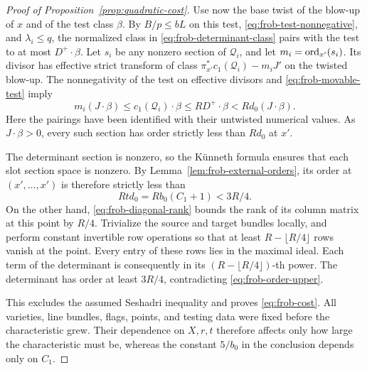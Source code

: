 \begin{proof}[Proof of Proposition~\ref{prop:quadratic-cost}]
Use now the base twist of the blow-up of $x$ and of the test class
$\beta$.  By $B/p\le bL$ on this test,
\eqref{eq:frob-test-nonnegative}, and $\lambda_i\le q$, the normalized
class in \eqref{eq:frob-determinant-class} pairs with the test to at
most $D^+\cdot\beta$.  Let $s_i$ be any nonzero section of
$\mathcal Q_i$, and let $m_i=\operatorname{ord}_{x'}(s_i)$.  Its divisor has effective
strict transform of class
$\pi_{x'}^*c_1(\mathcal Q_i)-m_iJ'$ on the twisted blow-up.  The
nonnegativity of the test on effective divisors and
\eqref{eq:frob-movable-test} imply
\[
 m_i(J\cdot\beta)
 \le c_1(\mathcal Q_i)\cdot\beta
 \le R D^+\cdot\beta
 <R d_0(J\cdot\beta).
\]
Here the pairings have been identified with their untwisted numerical
values.  As $J\cdot\beta>0$, every such section has order strictly less
than $Rd_0$ at $x'$.

The determinant section is nonzero, so the K\"unneth formula ensures
that each slot section space is nonzero.  By
Lemma~\ref{lem:frob-external-orders}, its order at
$(x',\ldots,x')$ is therefore strictly less than
\begin{equation}\label{eq:frob-order-upper}
 Rt d_0=R b_0(C_1+1)<3R/4.
\end{equation}
On the other hand, \eqref{eq:frob-diagonal-rank} bounds the rank of its
column matrix at this point by $R/4$.  Trivialize the source and target
bundles locally, and perform constant invertible row operations so
that at least $R-\lfloor R/4\rfloor$ rows vanish at the point.  Every
entry of these rows lies in the maximal ideal.  Each term of the
determinant is consequently in its
$(R-\lfloor R/4\rfloor)$-th power.  The determinant has order at least
$3R/4$, contradicting \eqref{eq:frob-order-upper}.

This excludes the assumed Seshadri inequality and proves
\eqref{eq:frob-cost}.  All varieties, line bundles, flags, points, and
testing data were fixed before the characteristic grew.  Their
dependence on $X,r,t$ therefore affects only how large the
characteristic must be, whereas the constant $5/b_0$ in the conclusion
depends only on $C_1$.
\end{proof}
